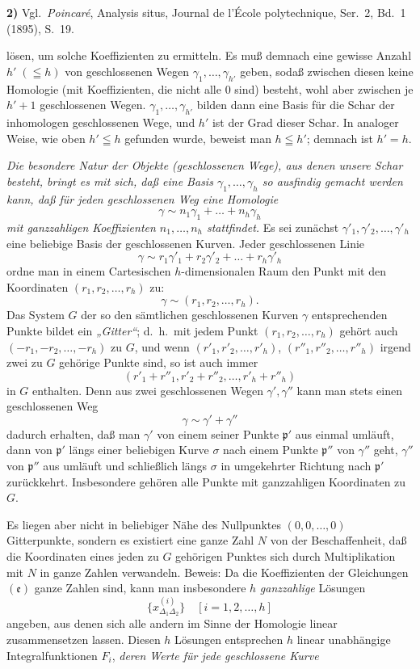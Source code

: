 \documentclass{article}
\begin{document}
\textbf{2)} Vgl.\ \emph{Poincaré}, Analysis situs, Journal de l'École polytechnique, Ser.\ 2, Bd.\ 1 (1895), S.~19.

lösen, um solche Koeffizienten zu ermitteln. Es muß demnach eine gewisse Anzahl $h' \; (\leqq h)$ von geschlossenen Wegen $\gamma_1, \dots, \gamma_{h'}$ geben, sodaß zwischen diesen keine Homologie (mit Koeffizienten, die nicht alle $0$ sind) besteht, wohl aber zwischen je $h' + 1$ geschlossenen Wegen. $\gamma_1, \dots, \gamma_{h'}$ bilden dann eine Basis für die Schar der inhomologen geschlossenen Wege, und $h'$ ist der Grad dieser Schar. In analoger Weise, wie oben $h' \leqq h$ gefunden wurde, beweist man $h \leqq h'$; demnach ist $h' = h$.

\emph{Die besondere Natur der Objekte (geschlossenen Wege), aus denen unsere Schar besteht, bringt es mit sich, daß eine Basis $\gamma_1, \dots, \gamma_h$ so ausfindig gemacht werden kann, daß für jeden geschlossenen Weg eine Homologie}
\[ \gamma \sim n_1 \gamma_1 + \dots + n_h \gamma_h \]
\emph{mit ganzzahligen Koeffizienten $n_1, \dots, n_h$ stattfindet.} Es sei zunächst $\gamma'_1, \gamma'_2, \dots, \gamma'_h$ eine beliebige Basis der geschlossenen Kurven. Jeder geschlossenen Linie
\[ \gamma \sim r_1 \gamma'_1 + r_2 \gamma'_2 + \dots + r_h \gamma'_h \]
ordne man in einem Cartesischen $h$-dimensionalen Raum den Punkt mit den Koordinaten $(r_1, r_2, \dots, r_h)$ zu:
\[ \gamma \sim (r_1, r_2, \dots, r_h). \]
Das System $G$ der so den sämtlichen geschlossenen Kurven $\gamma$ entsprechenden Punkte bildet ein \emph{„Gitter“}; d.~h.\ mit jedem Punkt $(r_1, r_2, \dots, r_h)$ gehört auch $(-r_1, -r_2, \dots, -r_h)$ zu $G$, und wenn $(r'_1, r'_2, \dots, r'_h)$, $(r''_1, r''_2, \dots, r''_h)$ irgend zwei zu $G$ gehörige Punkte sind, so ist auch immer
\[ (r'_1 + r''_1, r'_2 + r''_2, \dots, r'_h + r''_h) \]
in $G$ enthalten. Denn aus zwei geschlossenen Wegen $\gamma', \gamma''$ kann man stets einen geschlossenen Weg
\[ \gamma \sim \gamma' + \gamma'' \]
dadurch erhalten, daß man $\gamma'$ von einem seiner Punkte $\mathfrak{p}'$ aus einmal umläuft, dann von $\mathfrak{p}'$ längs einer beliebigen Kurve $\sigma$ nach einem Punkte $\mathfrak{p}''$ von $\gamma''$ geht, $\gamma''$ von $\mathfrak{p}''$ aus umläuft und schließlich längs $\sigma$ in umgekehrter Richtung nach $\mathfrak{p}'$ zurückkehrt. Insbesondere gehören alle Punkte mit ganzzahligen Koordinaten zu $G$.

Es liegen aber nicht in beliebiger Nähe des Nullpunktes $(0, 0, \dots, 0)$ Gitterpunkte, sondern es existiert eine ganze Zahl $N$ von der Beschaffenheit, daß die Koordinaten eines jeden zu $G$ gehörigen Punktes sich durch Multiplikation mit $N$ in ganze Zahlen verwandeln. Beweis: Da die Koeffizienten der Gleichungen $(\mathfrak{e})$ ganze Zahlen sind, kann man insbesondere $h$ \emph{ganzzahlige} Lösungen
\[ \{ x_{\Delta_1 \Delta_2}^{(i)} \} \quad [i = 1, 2, \dots, h] \]
angeben, aus denen sich alle andern im Sinne der Homologie linear zusammensetzen lassen. Diesen $h$ Lösungen entsprechen $h$ linear unabhängige Integralfunktionen $F_i$, \emph{deren Werte für jede geschlossene Kurve}
\end{document}
